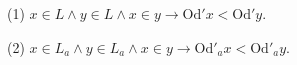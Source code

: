 (1) $x \in L \land y \in L \land x \in y \rightarrow \text{Od}'x < \text{Od}'y.$

(2) $x \in L_a \land y \in L_a \land x \in y \rightarrow \text{Od}'_a x < \text{Od}'_a y.$
